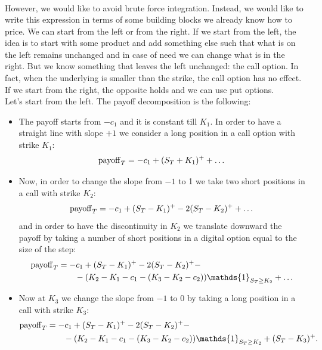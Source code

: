 \begin{example}{}{}{}
\begin{align}
    \end{align}
    However, we would like to avoid brute force integration. Instead, we would like to write this expression in terms of some building blocks we already know how to price. We can start from the left or from the right. If we start from the left, the idea is to start with some product and add something else such that what is on the left remains unchanged and in case of need we can change what is in the right. But we know something that leaves the left unchanged: the call option. In fact, when the underlying is smaller than the strike, the call option has no effect. If we start from the right, the opposite holds and we can use put options.\\
    Let's start from the left. The payoff decomposition is the following:
    \begin{itemize}
        \item The payoff starts from $-c_1$ and it is constant till $K_1$. In order to have a straight line with slope $+1$ we consider a long position in a call option with strike $K_1$:
        \begin{equation*}
            \operatorname{payoff}_T = -c_1 + (S_T+K_1)^+ +\dots
        \end{equation*}
        \item Now, in order to change the slope from $-1$ to 1 we take two short positions in a call with strike $K_2$:
        \begin{equation*}
            \operatorname{payoff}_T = -c_1 + (S_T-K_1)^+ - 2(S_T-K_2)^+ + \dots
        \end{equation*}
        and in order to have the discontinuity in $K_2$ we translate downward the payoff by taking a number of short positions in a digital option equal to the size of the step:
        \begin{align*}
            \pay_T &= -c_1 + (S_T-K_1)^+ - 2(S_T-K_2)^+ - \\
            &\qquad
            -(K_2-K_1-c_1-(K_3-K_2-c_2))\mathds{1}_{S_T\ge K_2} + \dots
        \end{align*}
        \item Now at $K_3$ we change the slope from $-1$ to 0 by taking a long position in a call with strike $K_3$:
        \begin{align}
            \notag \pay_T &= -c_1 + (S_T-K_1)^+ - 2(S_T-K_2)^+ - \\
            &\qquad
            -(K_2-K_1-c_1-(K_3-K_2-c_2))\mathds{1}_{S_T\ge K_2} + (S_T-K_3)^+.
        \end{align}

\end{itemize}
\end{example}
